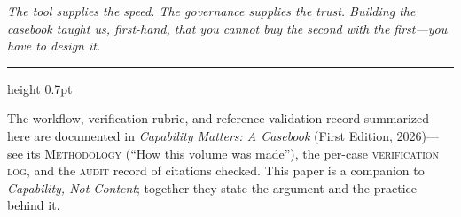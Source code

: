 \documentclass[11pt]{article}
\newcommand{\pullquote}[1]{%
  \begin{center}\begin{minipage}{0.86\linewidth}
  \color{lensquote}\itshape\large\RaggedRight #1
  \end{minipage}\end{center}}
\begin{document}
\pullquote{The tool supplies the speed. The governance supplies the trust. Building the casebook taught us, first-hand, that you cannot buy the second with the first---you have to design it.}

\vfill
{\color{lensrule}\hrule height 0.7pt}
\vspace{0.5em}
{\footnotesize\color{lensquote}
The workflow, verification rubric, and reference-validation record summarized here are documented in \emph{Capability Matters: A Casebook} (First Edition, 2026)---see its \textsc{Methodology} (``How this volume was made''), the per-case \textsc{verification log}, and the \textsc{audit} record of citations checked. This paper is a companion to \emph{Capability, Not Content}; together they state the argument and the practice behind it.}
\end{document}
